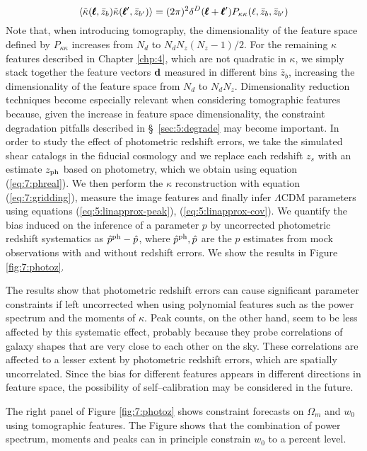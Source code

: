 \begin{equation}
\label{eq:7:crosspower}
\left\langle\tilde{\kappa}(\pmb{\ell},\bar{z}_b)\tilde{\kappa}(\pmb{\ell}',\bar{z}_{b'})\right\rangle = (2\pi)^2\delta^D(\pmb{\ell}+\pmb{\ell}')P_{\kappa\kappa}(\ell,\bar{z}_b,\bar{z}_{b'})
\end{equation} 
%
Note that, when introducing tomography, the dimensionality of the feature space defined by $P_{\kappa\kappa}$ increases from $N_d$ to $N_d N_z(N_z-1)/2$. For the remaining $\kappa$ features described in Chapter \ref{chp:4}, which are not quadratic in $\kappa$, we simply stack together the feature vectors $\mathbf{d}$ measured in different bins $\bar{z}_b$, increasing the dimensionality of the feature space from $N_d$ to $N_dN_z$. Dimensionality reduction techniques become especially relevant when considering tomographic features because, given the increase in feature space dimensionality, the constraint degradation pitfalls described in \S~\ref{sec:5:degrade} may become important. In order to study the effect of photometric redshift errors, we take the simulated shear catalogs in the fiducial cosmology and we replace each redshift $z_s$ with an estimate $z_{\rm ph}$ based on photometry, which we obtain using equation (\ref{eq:7:phreal}). We then perform the $\kappa$ reconstruction with equation (\ref{eq:7:gridding}), measure the image features and finally infer $\Lambda$CDM parameters using equations (\ref{eq:5:linapprox-peak}), (\ref{eq:5:linapprox-cov}). We quantify the bias induced on the inference of a parameter $p$ by uncorrected photometric redshift systematics as $\hat{p}^{\rm ph}-\hat{p}$, where $\hat{p}^{\rm ph},\hat{p}$ are the $p$ estimates from mock observations with and without redshift errors. We show the results in Figure \ref{fig:7:photoz}. 

The results show that photometric redshift errors can cause significant parameter constraints if left uncorrected when using polynomial features such as the power spectrum and the moments of $\kappa$. Peak counts, on the other hand, seem to be less affected by this systematic effect, probably because they probe correlations of galaxy shapes that are very close to each other on the sky. These correlations are affected to a lesser extent by photometric redshift errors, which are spatially uncorrelated. Since the bias for different features appears in different directions in feature space, the possibility of self--calibration may be considered in the future.

The right panel of Figure \ref{fig:7:photoz} shows constraint forecasts on $\Omega_m$ and $w_0$ using tomographic features. The Figure shows that the combination of power spectrum, moments and peaks can in principle constrain $w_0$ to a percent level.   


